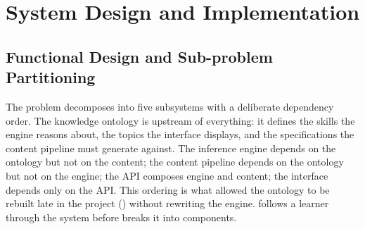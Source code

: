 \chapter{System Design and Implementation}
\label{ch:design}

\section{Functional Design and Sub-problem Partitioning}
\label{sec:architecture}

The problem decomposes into five subsystems with a deliberate dependency
order. The knowledge ontology is upstream of everything: it defines the skills
the engine reasons about, the topics the interface displays, and the
specifications the content pipeline must generate against. The inference engine
depends on the ontology but not on the content; the content pipeline depends on
the ontology but not on the engine; the API composes engine and content; the
interface depends only on the API. This ordering is what allowed the ontology to
be rebuilt late in the project () without rewriting
the engine.  follows a learner through the system before
 breaks it into components.



